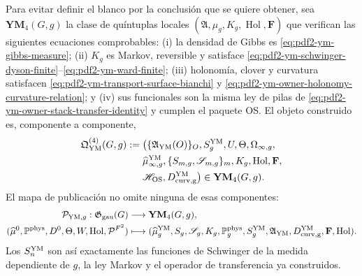 Para evitar definir el blanco por la conclusión que se quiere obtener, sea
$\mathbf{YM}_4(G,g)$ la clase de quíntuplas locales
$(\mathfrak A,\mu_g,K_g,\operatorname{Hol},\mathbf F)$ que verifican las siguientes
ecuaciones comprobables: (i) la densidad de Gibbs es
\eqref{eq:pdf2-ym-gibbs-measure}; (ii) $K_g$ es Markov, reversible y satisface
\eqref{eq:pdf2-ym-schwinger-dyson-finite}--\eqref{eq:pdf2-ym-ward-finite};
(iii) holonomía, clover y curvatura satisfacen
\eqref{eq:pdf2-ym-transport-surface-bianchi} y
\eqref{eq:pdf2-ym-owner-holonomy-curvature-relation}; y (iv) sus funcionales son la
misma ley de pilas de \eqref{eq:pdf2-ym-owner-stack-transfer-identity} y cumplen el
paquete OS\@. El objeto construido es, componente a componente,
\begin{equation}\label{eq:pdf2-ym-owner-qym-object}
\begin{aligned}
 \mathfrak Q_{\rm YM}^{(4)}(G,g):={}&
 \bigl(\{\mathfrak A_{\rm YM}(O)\}_O,
 S_g^{\rm YM},U,\Theta,\Omega_{\infty,g},\\
 &\widehat\mu_{\infty,g}^{\rm YM},
 \{S_{m,g},\mathscr S_{m,g}\}_m,K_g,
 \operatorname{Hol},\mathbf F,\\
 &\mathscr H_{\rm OS},D_{\rm curv,g}^{\rm YM}\bigr)
 \in\mathbf{YM}_4(G,g).
\end{aligned}
\end{equation}
El mapa de publicación no omite ninguna de esas componentes:
\begin{equation}\label{eq:pdf2-ym-owner-typed-publication-map}
 \begin{aligned}
 \mathcal P_{{\rm YM},g}:\mathfrak G_{\rm gau}(G)&\longrightarrow
 \mathbf{YM}_4(G,g),\\
 (\widehat\mu^0,\mathbb P^{\rm phys},D^0,\Theta,W,
   \operatorname{Hol},\mathcal P^{F^2})
 &\longmapsto
 (\widehat\mu_g^{\rm YM},S_g,\mathscr S_g,K_g,\mathbb P_g^{\rm phys},
  S_g^{\rm YM},\mathfrak A_{\rm YM},D_{\rm curv,g}^{\rm YM},
  \mathbf F,\operatorname{Hol}).
 \end{aligned}
\end{equation}
Los $S_n^{\rm YM}$ son así exactamente las funciones de Schwinger de la medida
dependiente de $g$, la ley Markov y el operador de transferencia ya construidos.

